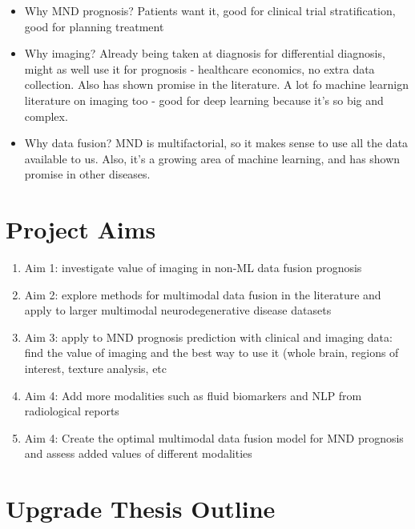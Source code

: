 \begin{itemize}
    \item Why MND prognosis? Patients want it, good for clinical trial stratification, good for planning treatment
    \item Why imaging? Already being taken at diagnosis for differential diagnosis, might as well use it for prognosis - healthcare economics, no extra data collection. Also has shown promise in the literature. A lot fo machine learnign literature on imaging too - good for deep learning because it's so big and complex.
    \item Why data fusion? MND is multifactorial, so it makes sense to use all the data available to us. Also, it's a growing area of machine learning, and has shown promise in other diseases.
\end{itemize}

\section{Project Aims}

\begin{enumerate}
    \item Aim 1: investigate value of imaging in non-ML data fusion prognosis
    \item Aim 2: explore methods for multimodal data fusion in the literature and apply to larger multimodal neurodegenerative disease datasets
    \item Aim 3: apply to MND prognosis prediction with clinical and imaging data: find the value of imaging and the best way to use it (whole brain, regions of interest, texture analysis, etc
    \item Aim 4: Add more modalities such as fluid biomarkers and NLP from radiological reports
    \item Aim 4: Create the optimal multimodal data fusion model for MND prognosis and assess added values of different modalities
\end{enumerate}

\section{Upgrade Thesis Outline}
